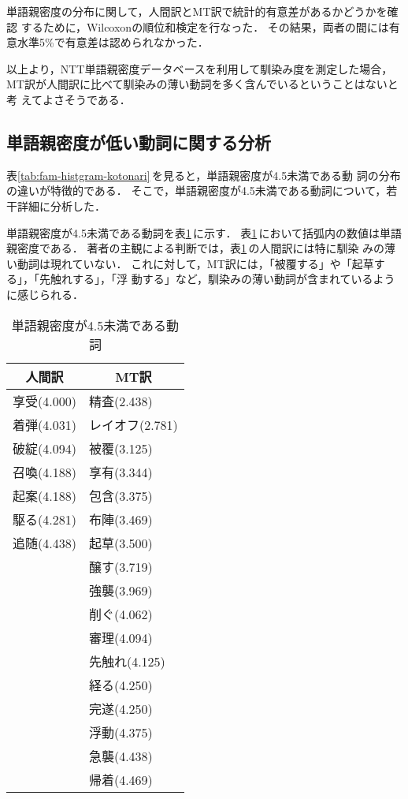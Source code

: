 単語親密度の分布に関して，人間訳とMT訳で統計的有意差があるかどうかを確認
するために，Wilcoxonの順位和検定を行なった．
その結果，両者の間には有意水準5\%で有意差は認められなかった．

以上より，NTT単語親密度データベースを利用して馴染み度を測定した場合，
MT訳が人間訳に比べて馴染みの薄い動詞を多く含んでいるということはないと考
えてよさそうである．


\subsection{単語親密度が低い動詞に関する分析}
\label{sec:result:low-fam}

表\ref{tab:fam-histgram-kotonari}\,を見ると，単語親密度が4.5未満である動
詞の分布の違いが特徴的である．
そこで，単語親密度が4.5未満である動詞について，若干詳細に分析した．

単語親密度が4.5未満である動詞を表\ref{tab:lowfam-word}\,に示す．
表\ref{tab:lowfam-word}\,において括弧内の数値は単語親密度である．
著者の主観による判断では，表\ref{tab:lowfam-word}\,の人間訳には特に馴染
みの薄い動詞は現れていない．
これに対して，MT訳には，「被覆する」や「起草する」，「先触れする」，「浮
動する」など，馴染みの薄い動詞が含まれているように感じられる．
\begin{table}[htbp]
\caption{単語親密度が4.5未満である動詞}
\label{tab:lowfam-word}
\begin{center}
\begin{tabular}{|l||l|}\hline
\multicolumn{1}{|c||}{人間訳} & \multicolumn{1}{c|}{MT訳} \\\hline
享受(4.000) & 精査(2.438) \\
着弾(4.031) & レイオフ(2.781) \\
破綻(4.094) & 被覆(3.125) \\
召喚(4.188) & 享有(3.344) \\
起案(4.188) & 包含(3.375) \\
駆る(4.281) & 布陣(3.469) \\
追随(4.438) & 起草(3.500) \\
	    & 醸す(3.719) \\
	    & 強襲(3.969) \\
	    & 削ぐ(4.062) \\
	    & 審理(4.094) \\
	    & 先触れ(4.125) \\
	    & 経る(4.250) \\
	    & 完遂(4.250) \\
	    & 浮動(4.375) \\
	    & 急襲(4.438) \\
	    & 帰着(4.469) \\\hline
\end{tabular}
\end{center}
\end{table}


